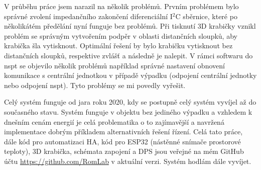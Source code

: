 V průběhu práce jsem narazil na několik problémů. Prvním problémem bylo správné zvolení impedančního zakončení diferenciální I$^{2}$C sběrnice, které po několikátém předělání nyní funguje bez problémů. Při tisknutí 3D krabičky vznikl problém se správným vytvořením podpěr v oblasti distančních sloupků, aby krabička šla vytisknout. Optimální řešení by bylo krabičku vytisknout bez distančních sloupků, respektive zvlášť a následně je nalepit. V rámci softwaru do \acrshort{nspt} se objevilo několik problémů například správné nastavení obnovení komunikace s centrální jednotkou v případě výpadku (odpojení centrální jednotky nebo odpojení \acrshort{nspt}). Tyto problémy se mi povedly vyřešit.

Celý systém funguje od jara roku 2020, kdy se postupně celý systém vyvíjel až do současného stavu. Systém funguje v objektu bez jediného výpadku a vzhledem k dnešním cenám energií je celá problematika o to zajímavější a navržená implementace dobrým příkladem alternativních řešení řízení. Celá tato práce, dále kód pro automatizaci HA, kód pro ESP32 (nástěnné snímače prostorové teploty), 3D krabička, schémata zapojení a DPS jsou veřejné na mém GitHub účtu \mbox{\url{https://github.com/RomLab}} v aktuální verzi. Systém hodlám dále vyvíjet.

